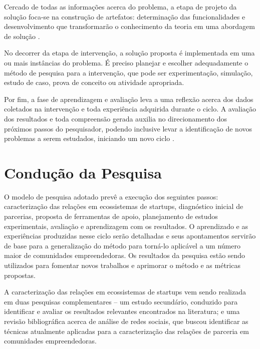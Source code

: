 Cercado de todas as informações acerca do problema, a etapa de projeto da solução foca-se na construção de artefatos: determinação das funcionalidades e desenvolvimento que transformarão o conhecimento da teoria em uma abordagem de solução \cite{peffers-et-al:2007}.

No decorrer da etapa de intervenção, a solução proposta é implementada em uma ou mais instâncias do problema. É preciso planejar e escolher adequadamente o método de pesquisa para a intervenção, que pode ser experimentação, simulação, estudo de caso, prova de conceito ou atividade apropriada.

Por fim, a fase de aprendizagem e avaliação leva a uma reflexão acerca dos dados coletados na intervenção e toda experiência adquirida durante o ciclo. A avaliação dos resultados e toda compreensão gerada auxilia no direcionamento dos próximos passos do pesquisador, podendo inclusive levar a identificação de novos problemas a serem estudados, iniciando um novo ciclo \cite{dresch:2015}.


\section{Condução da Pesquisa}

O modelo de pesquisa adotado prevê a execução dos seguintes passos: caracterização das relações em ecossistemas de startups, diagnóstico inicial de parcerias, proposta de ferramentas de apoio, planejamento de estudos experimentais, avaliação e aprendizagem com os resultados. O aprendizado e as experiências produzidas nesse ciclo serão detalhadas e seus apontamentos servirão de base para a generalização do método para torná-lo aplicável a um número maior de comunidades empreendedoras. Os resultados da pesquisa estão sendo utilizados para fomentar novos trabalhos e aprimorar o método e as métricas propostas. 

A caracterização das relações em ecossistemas de startups vem sendo realizada em duas pesquisas complementares – um estudo secundário, conduzido para identificar e avaliar os resultados relevantes encontrados na literatura; e uma revisão bibliográfica acerca de análise de redes sociais, que buscou identificar as técnicas atualmente aplicadas para a caracterização das relações de parceria em comunidades empreendedoras.


